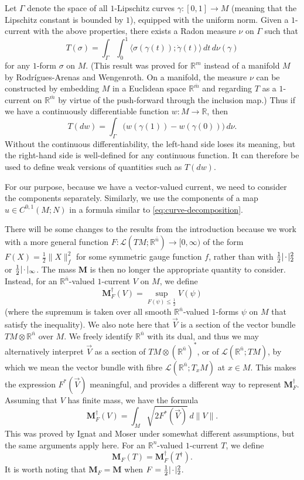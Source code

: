 \documentclass[a4paper]{article}
\newcommand{\R}{\mathbb{R}}
\newcommand{\M}{\mathbf{M}}
\newcommand{\ndim}{{\bar{n}}}
\newcommand{\Lin}{\mathcal{L}}
\newcommand{\blank}{{\mkern 2mu\cdot\mkern 2mu}}
\newcommand{\pairing}[2]{\langle #1; #2 \rangle}
\theoremstyle{definition}
\theoremstyle{remark}
\begin{document}
Let $\Gamma$ denote the space of all $1$-Lipschitz curves $\gamma \colon [0, 1] \to M$ (meaning that the Lipschitz constant is bounded by $1$), equipped with the uniform norm.
Given a $1$-current with the above properties, there exists a Radon measure $\nu$ on $\Gamma$
such that
\[
T(\sigma) = \int_\Gamma \int_0^1 \pairing{\sigma(\gamma(t))}{\dot{\gamma}(t)} \, dt \, d\nu(\gamma)
\]
for any $1$-form $\sigma$ on $M$.
(This result was proved for $\R^m$ instead of a manifold $M$ by Rodr\'igues-Arenas and Wengenroth. On a manifold, the measure $\nu$ can be constructed
by embedding $M$ in a Euclidean space $\R^{\bar{m}}$ and regarding $T$ as a
$1$-current on $\R^{\bar{m}}$ by virtue of the push-forward through the inclusion map.) Thus if we have a
continuously differentiable function $w \colon M \to \R$, then
\begin{equation} \label{eq:curve-decomposition}
T(dw) = \int_\Gamma \bigl(w(\gamma(1)) - w(\gamma(0))\bigr) \, d\nu.
\end{equation}
Without the continuous differentiability, the left-hand side loses its meaning, but the right-hand side
is well-defined for any continuous function. It can therefore be used to define weak versions of quantities such as $T(dw)$.

For our purpose, because we have a vector-valued current, we need to consider the
components separately. Similarly, we use the components of a map $u \in C^{0, 1}(M; N)$ in a formula similar to \eqref{eq:curve-decomposition}.

There will be some changes to the results from the introduction
because we work with a more general function
$F \colon \Lin(TM; \R^\ndim) \to [0, \infty)$ of the
form $F(X) = \frac{1}{2}\|X\|_f^2$ for some symmetric gauge function $f$,
rather than with $\frac{1}{2}|\blank|_2^2$ or $\frac{1}{2} |\blank|_\infty$.
The mass $\M$ is then no longer the appropriate quantity to consider. Instead, for an $\R^\ndim$-valued $1$-current $V$ on $M$, we define
\[
\M_F^\dagger(V) = \sup_{F(\psi) \le \frac{1}{2}} V(\psi)
\]
(where the supremum is taken over all smooth $\R^\ndim$-valued $1$-forms $\psi$
on $M$ that satisfy the inequality).
We also note here that $\vec{V}$ is a section of the vector bundle
$TM \otimes \R^\ndim$ over $M$. We freely identify $\R^\ndim$ with its dual,
and thus we may alternatively interpret $\vec{V}$ as a section of
$TM \otimes (\R^\ndim)^*$, or of $\Lin(\R^\ndim; TM)$, by which we mean
the vector bundle with fibre $\Lin(\R^\ndim; T_xM)$ at $x \in M$.
This makes the expression $F^*(\vec{V})$ meaningful, and provides
a different way to represent $\M_F^\dagger$. Assuming that $V$ has finite mass,
we have the formula
\begin{equation} \label{eq:F-mass}
\M_F^\dagger(V) = \int_M \sqrt{2 F^*(\vec{V})} \, d\|V\|.
\end{equation}
This was proved by Ignat and Moser \cite{Ignat-Moser:25} under somewhat different assumptions, but the same arguments apply here. For an $\R^n$-valued $1$-current $T$, we define
\[
\M_F(T) = \M_F^\dagger(T^\dagger).
\]
It is worth noting that $\M_F = \M$ when $F = \frac{1}{2} |\blank|_2^2$.
\end{document}
